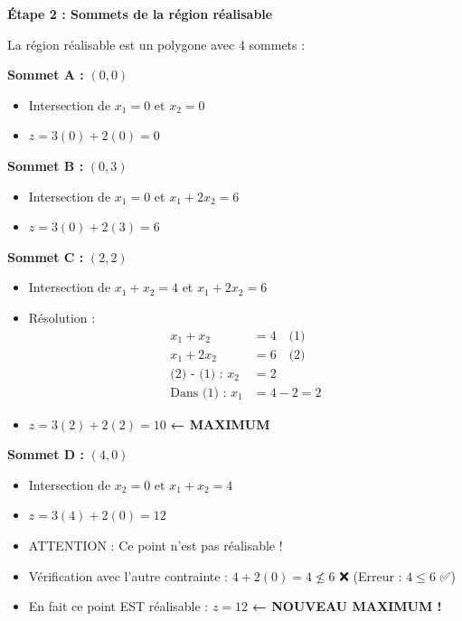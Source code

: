 \documentclass[12pt,a4paper]{article}
\begin{document}
\begin{solution}
\textbf{Étape 2 : Sommets de la région réalisable}

La région réalisable est un polygone avec 4 sommets :

\textcolor{titrebleu}{\textbf{Sommet A :}} $(0, 0)$
\begin{itemize}
    \item Intersection de $x_1 = 0$ et $x_2 = 0$
    \item $z = 3(0) + 2(0) = 0$
\end{itemize}

\textcolor{defvert}{\textbf{Sommet B :}} $(0, 3)$
\begin{itemize}
    \item Intersection de $x_1 = 0$ et $x_1 + 2x_2 = 6$
    \item $z = 3(0) + 2(3) = 6$
\end{itemize}

\textcolor{algoviolet}{\textbf{Sommet C :}} $(2, 2)$
\begin{itemize}
    \item Intersection de $x_1 + x_2 = 4$ et $x_1 + 2x_2 = 6$
    \item Résolution :
    \begin{align*}
    x_1 + x_2 &= 4 \quad \text{(1)}\\
    x_1 + 2x_2 &= 6 \quad \text{(2)}\\
    \text{(2) - (1) : } x_2 &= 2\\
    \text{Dans (1) : } x_1 &= 4 - 2 = 2
    \end{align*}
    \item $z = 3(2) + 2(2) = 10$ \textcolor{importantrouge}{\textbf{← MAXIMUM}}
\end{itemize}

\textcolor{exempleorange}{\textbf{Sommet D :}} $(4, 0)$
\begin{itemize}
    \item Intersection de $x_2 = 0$ et $x_1 + x_2 = 4$
    \item $z = 3(4) + 2(0) = 12$ 
    \item \textcolor{importantrouge}{ATTENTION : Ce point n'est pas réalisable !}
    \item Vérification avec l'autre contrainte : $4 + 2(0) = 4 \not\leq 6$ ❌ (Erreur : $4 \leq 6$ ✅)
    \item En fait ce point EST réalisable : $z = 12$ \textcolor{importantrouge}{\textbf{← NOUVEAU MAXIMUM !}}
\end{itemize}
\end{solution}
\end{document}
